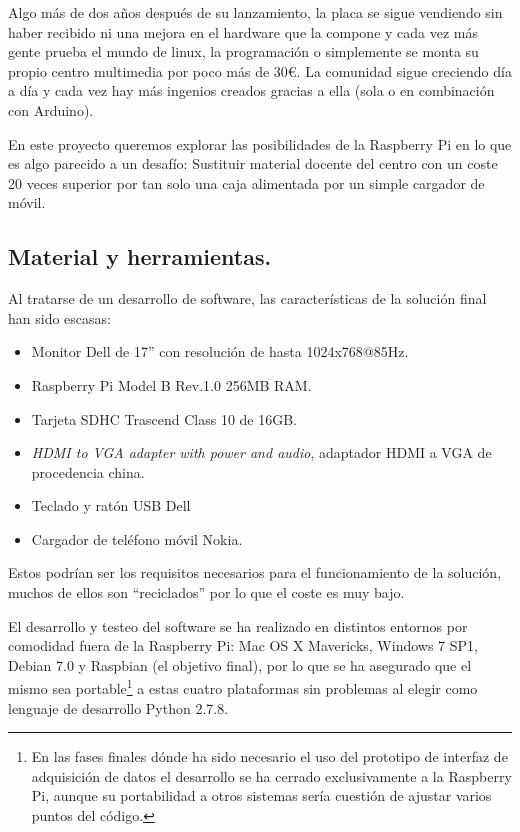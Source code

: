   Algo más de dos años después de su lanzamiento, la placa se sigue vendiendo sin haber recibido ni una mejora en el hardware que la compone y cada vez más gente prueba el mundo de linux, la programación o simplemente se monta su propio centro multimedia por poco más de 30€. La comunidad sigue creciendo día a día y cada vez hay más ingenios creados gracias a ella (sola o en combinación con Arduino).
  
  En este proyecto queremos explorar las posibilidades de la Raspberry Pi en lo que es algo parecido a un desafío: Sustituir material docente del centro con un coste 20 veces superior por tan solo una caja alimentada por un simple cargador de móvil.
 
\subsection{Material y herramientas.}
  Al tratarse de un desarrollo de software, las características de la solución final han sido escasas:
  \begin{itemize}
    \item{Monitor Dell de 17'' con resolución de hasta 1024x768@85Hz.}
    \item{Raspberry Pi Model B Rev.1.0 256MB RAM.}
    \item{Tarjeta SDHC Trascend Class 10 de 16GB.}
    \item{\emph{HDMI to VGA adapter with power and audio}, adaptador HDMI a VGA de procedencia china.}
    \item{Teclado y ratón USB Dell}
    \item{Cargador de teléfono móvil Nokia.}
  \end{itemize}
    Estos podrían ser los requisitos necesarios para el funcionamiento de la solución, muchos de ellos son ``reciclados'' por lo que el coste es muy bajo.

  El desarrollo y testeo del software se ha realizado en distintos entornos por comodidad fuera de la Raspberry Pi: Mac OS X Mavericks, Windows 7 SP1, Debian 7.0 y Raspbian (el objetivo final), por lo que se ha asegurado que el mismo sea portable\footnote{En las fases finales dónde ha sido necesario el uso del prototipo de interfaz de adquisición de datos el desarrollo se ha cerrado exclusivamente a la Raspberry Pi, aunque su portabilidad a otros sistemas sería cuestión de ajustar varios puntos del código.} a estas cuatro plataformas sin problemas al elegir como lenguaje de desarrollo Python 2.7.8. 

